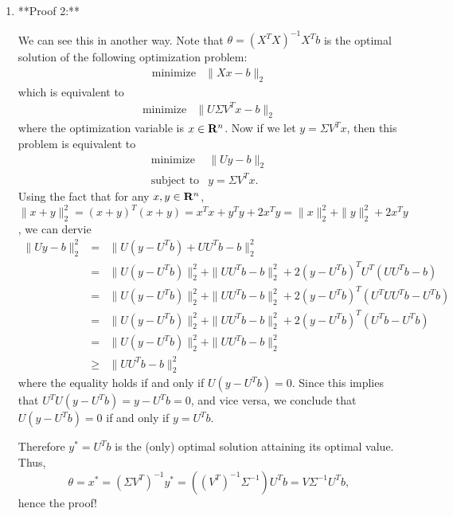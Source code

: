 \begin{enumerate}
\begin{solution}
\begin{enumerate}
\item

**Proof 2:**

We can see this in another way. Note that $\theta = (X^TX)^{-1}X^Tb$ is the optimal solution of the following optimization problem:
\begin{equation}
\begin{array}{ll}
\mbox{minimize} & \|Xx - b\|_2
\end{array}
\end{equation}
which is equivalent to
\begin{equation}
\begin{array}{ll}
\mbox{minimize} & \|U\Sigma V^T x - b\|_2
\end{array}
\end{equation}
where the optimization variable is $x\in\mathbf{R}^n$.
Now if we let $y = \Sigma V^T x$, then this problem is equivalent to
\begin{equation}
\begin{array}{ll}
\mbox{minimize} & \|U y - b\|_2
\\
\mbox{subject to} & y = \Sigma V^T x.
\end{array}
\end{equation}
Using the fact that for any $x,y\in\mathbf{R}^n$,
$\|x+y\|_2^2 = (x+y)^T(x+y) = x^Tx + y^Ty + 2x^Ty = \|x\|_2^2 + \|y\|_2^2 + 2x^Ty$,
we can dervie
\begin{eqnarray*}
\|U y - b\|_2^2
&=&
\|U (y - U^Tb) + UU^Tb - b\|_2^2
\\ &=&
\|U (y - U^Tb)\|_2^2 + \|UU^Tb - b\|_2^2
+2 (y-U^Tb)^T U^T (UU^Tb - b)
\\ &=&
\|U (y - U^Tb)\|_2^2 + \|UU^Tb - b\|_2^2
+2 (y-U^Tb)^T (U^TUU^Tb - U^Tb)
\\ &=&
\|U (y - U^Tb)\|_2^2 + \|UU^Tb - b\|_2^2
+2 (y-U^Tb)^T (U^Tb - U^Tb)
\\ &=&
\|U (y - U^Tb)\|_2^2 + \|UU^Tb - b\|_2^2
\\
&\geq&
\|UU^Tb - b\|_2^2
\end{eqnarray*}
where the equality holds if and only if $U (y - U^Tb)=0$.
Since this implies that $U^T U(y-U^Tb) = y-U^Tb = 0$,
and vice versa, we conclude that $U (y - U^Tb)=0$ if and only if $y=U^Tb$.

Therefore $y^\ast = U^Tb$ is the (only) optimal solution attaining its optimal value.
Thus,
\begin{equation}
\theta = x^\ast = (\Sigma V^T)^{-1} y^\ast = ((V^T)^{-1} \Sigma^{-1}) U^T b = V \Sigma^{-1} U^T b,
\end{equation}
hence the proof!











\end{enumerate}
\end{solution}
\end{enumerate}
